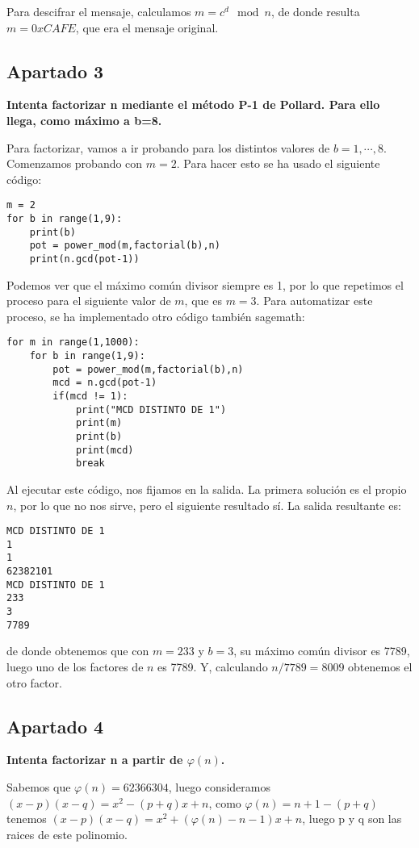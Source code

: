 \documentclass[a4paper]{article}
\begin{document}
Para descifrar el mensaje, calculamos $m = c^d \mod n$, de donde resulta $m=0xCAFE$, que era el mensaje original.

\subsection{Apartado 3}
\textbf{Intenta factorizar n mediante el método P-1 de Pollard. Para ello llega, como máximo a b=8.}

Para factorizar, vamos a ir probando para los distintos valores de $b=1,\cdots ,8$. Comenzamos probando con $m=2$. Para hacer esto se ha usado el siguiente código:

\begin{verbatim}
m = 2
for b in range(1,9):
    print(b)
    pot = power_mod(m,factorial(b),n)
    print(n.gcd(pot-1))
\end{verbatim}

Podemos ver que el máximo común divisor siempre es 1, por lo que repetimos el proceso para el siguiente valor de $m$, que es $m=3$. Para automatizar este proceso, se ha implementado otro código también sagemath:

\begin{verbatim}
for m in range(1,1000):
    for b in range(1,9):
        pot = power_mod(m,factorial(b),n)
        mcd = n.gcd(pot-1)
        if(mcd != 1):
            print("MCD DISTINTO DE 1")
            print(m)
            print(b)
            print(mcd)
            break
\end{verbatim}

Al ejecutar este código, nos fijamos en la salida. La primera solución es el propio $n$, por lo que no nos sirve, pero el siguiente resultado sí. La salida resultante es:

\begin{verbatim}
MCD DISTINTO DE 1
1
1
62382101
MCD DISTINTO DE 1
233
3
7789
\end{verbatim}

de donde obtenemos que con $m=233$ y $b=3$, su máximo común divisor es 7789, luego uno de los factores de $n$ es 7789. Y, calculando $n/7789=8009$ obtenemos el otro factor.


\subsection{Apartado 4}
\textbf{Intenta factorizar n a partir de $\varphi(n)$.}

Sabemos que $\varphi(n)=62366304$, luego consideramos $(x-p)(x-q)=x^2-(p+q)x+n$, como $\varphi(n)= n+1-(p+q)$ tenemos $(x-p)(x-q)=x^2+(\varphi(n)-n-1)x+n$, luego p y q son las raices de este polinomio.
\end{document}
